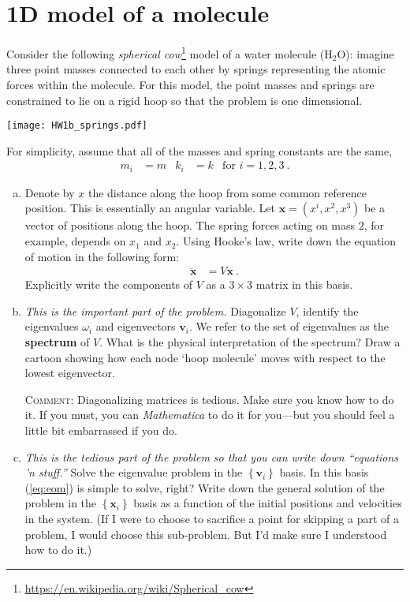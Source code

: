 \documentclass[12pt]{article}
\numberwithin{equation}{section}    %
\renewcommand{\vec}[1]{\mathbf{#1}} %
\begin{document}
\section{1D model of a molecule}


Consider the following \emph{spherical cow}\footnote{\url{https://en.wikipedia.org/wiki/Spherical_cow}} model of a water molecule (H$_2$O): imagine three point masses connected to each other by springs representing the atomic forces within the molecule. For this model, the point masses and springs are constrained to lie on a rigid hoop so that the problem is one dimensional. 

\begin{center}
	\texttt{[image: HW1b\_springs.pdf]}
\end{center}

For simplicity, assume that all of the masses and spring constants are the same,
\begin{align}
	m_i &= m & k_i &= k 
	&
	\text{for } i=1,2,3 
	\ .
\end{align}

\begin{enumerate}[(a)]
	\item Denote by $x$ the distance along the hoop from some common reference position. This is essentially an angular variable. Let $\vec{x} = (x^i, x^2, x^3)$ be a vector of positions along the hoop. The spring forces acting on mass $2$, for example, depends on $x_1$ and $x_2$. Using Hooke's law, write down the equation of motion in the following form:
\begin{align}
	\ddot{\vec{x}} &= V \vec{x} \ .
	\label{eq:eom}
\end{align}
Explicitly write the components of $V$ as a $3\times 3$ matrix in this basis.

	\item 
\emph{This is the important part of the problem.}
Diagonalize $V$, identify the eigenvalues $\omega_i$ and eigenvectors $\vec{v}_i$. We refer to the set of eigenvalues as the \textbf{spectrum} of $V$. What is the physical interpretation of the spectrum? Draw a cartoon showing how each node `hoop molecule' moves with respect to the lowest eigenvector. 

\textsc{Comment}: Diagonalizing matrices is tedious. Make sure you know how to do it. If you must, you can \emph{Mathematica} to do it for you---but you should feel a little bit embarrassed if you do. 

\item 
\emph{This is the tedious part of the problem so that you can write down ``equations 'n stuff.''}
Solve the eigenvalue problem in the $\left\{ \vec{v}_i\right \}$ basis. In this basis (\ref{eq:eom}) is simple to solve, right? Write down the general solution of the problem in the $\left\{ \vec{x}_i\right \}$ basis as a function of the initial positions and velocities in the system.  (If I were to choose to sacrifice a point for skipping a part of a problem, I would choose this sub-problem. But I'd make sure I understood how to do it.)

\end{enumerate}
\end{document}
